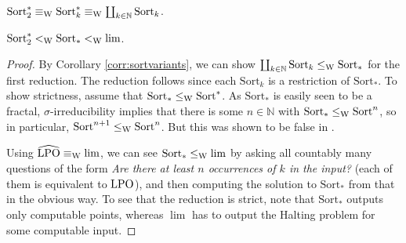 \documentclass{eptcs-modified}
\begin{document}
\begin{corollary}
\label{corr:sortvariants}
$\mathrm{Sort}_2^* \equiv_{\textrm{W}} \mathrm{Sort}_k^* \equiv_{\textrm{W}} \coprod_{k \in \mathbb{N}} \mathrm{Sort}_k$.
\end{corollary}

\begin{proposition}
$\mathrm{Sort}_2^* <_{\textrm{W}} \mathrm{Sort}_* <_{\textrm{W}} \lim$.
\begin{proof}
By Corollary \ref{corr:sortvariants}, we can show $\coprod_{k \in \mathbb{N}} \mathrm{Sort}_k \leq_{\textrm{W}} \mathrm{Sort}_*$ for the first reduction. The reduction follows since each $\mathrm{Sort}_k$ is a restriction of $\mathrm{Sort}_*$. To show strictness, assume that $\mathrm{Sort}_* \leq_{\textrm{W}} \mathrm{Sort}^*$. As $\mathrm{Sort}_*$ is easily seen to be a fractal, $\sigma$-irreducibility implies that there is some $n \in \mathbb{N}$ with $\mathrm{Sort}_* \leq_{\textrm{W}} \mathrm{Sort}^n$, so in particular, $\mathrm{Sort}^{n+1} \leq_{\textrm{W}} \mathrm{Sort}^n$. But this was shown to be false in \cite{paulyneumann}.

Using $\widehat{\textrm{LPO}} \equiv_{\textrm{W}} \lim$, we can see $\mathrm{Sort}_* \leq_{\textrm{W}} \lim$ by asking all countably many questions of the form \emph{Are there at least $n$ occurrences of $k$ in the input?} (each of them is equivalent to $\textrm{LPO}$), and then computing the solution to $\mathrm{Sort}_*$ from that in the obvious way. To see that the reduction is strict, note that $\mathrm{Sort}_*$ outputs only computable points, whereas $\lim$ has to output the Halting problem for some computable input.
\end{proof}
\end{proposition}
\end{document}
